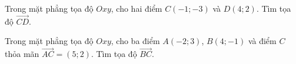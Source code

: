 \begin{bt}%
Trong mặt phẳng tọa độ $Oxy$, cho hai điểm $C(-1; -3)$ và $D(4; 2)$. Tìm tọa độ $\overrightarrow{CD}$.
\end{bt}

\begin{bt}%
Trong mặt phẳng tọa độ $Oxy$, cho ba điểm $A(-2; 3)$, $B(4; -1)$ và điểm $C$ thỏa mãn $\overrightarrow{AC}=(5; 2)$. Tìm tọa độ $\overrightarrow{BC}$.
\end{bt}

